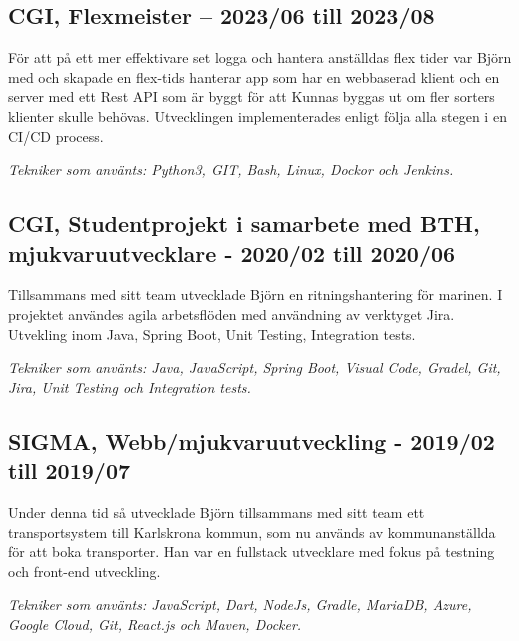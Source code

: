 \documentclass{article}
\begin{document}
\begin{minipage}[t]{0.7\textwidth}
  
  \vspace{15pt} %
  \subsection*{\textcolor{colorTitelErfarenhet}{CGI, Flexmeister – 2023/06 till 2023/08}}
  För att på ett mer effektivare set logga och hantera anställdas flex tider var Björn med och 
  skapade en flex-tids hanterar app som har en webbaserad klient och en server med ett Rest API som är 
  byggt för att Kunnas byggas ut om fler sorters klienter skulle behövas. Utvecklingen implementerades 
  enligt följa alla stegen i en CI/CD process.

  \vspace{5pt}\textit{Tekniker som använts: Python3, GIT, Bash, Linux, Dockor och Jenkins.}

  \vspace{15pt} %
  \subsection*{\textcolor{colorTitelErfarenhet}{CGI, Studentprojekt i samarbete med BTH, mjukvaruutvecklare - 2020/02 till 2020/06}}
  Tillsammans med sitt team utvecklade Björn en ritningshantering för marinen. 
  I projektet användes agila arbetsflöden med användning av verktyget Jira. 
  Utvekling inom Java, Spring Boot, Unit Testing, Integration tests.
  
  \vspace{5pt}\textit{Tekniker som använts: Java, JavaScript, Spring Boot, Visual Code, Gradel, Git, Jira, Unit Testing och Integration tests.} 
  
  \vspace{15pt} %
  \subsection*{\textcolor{colorTitelErfarenhet}{SIGMA, Webb/mjukvaruutveckling - 2019/02 till 2019/07}}
  Under denna tid så utvecklade Björn tillsammans med sitt team ett transportsystem 
  till Karlskrona kommun, som nu används av kommunanställda för att boka transporter. 
  Han var en fullstack utvecklare med fokus på testning och front-end utveckling.
  
  \vspace{5pt}\textit{Tekniker som använts: JavaScript, Dart, NodeJs, Gradle, MariaDB, Azure, Google Cloud, Git, React.js och Maven, Docker.} 
  


\end{minipage}
\end{document}
